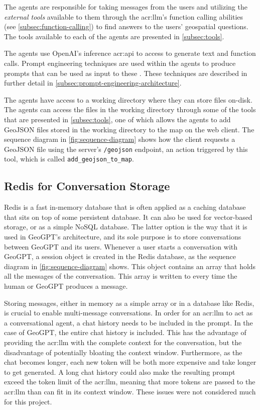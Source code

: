 The agents are responsible for taking messages from the users and utilizing the \textit{external tools} available to them through the \acrshort{acr:llm}'s function calling abilities (see \autoref{subsec:function-calling}) to find answers to the users' geospatial questions. The tools available to each of the agents are presented in \autoref{subsec:tools}.

The agents use OpenAI's inference \acrshort{acr:api} to access  to generate text and function calls. Prompt engineering techniques are used within the agents to produce prompts that can be used as input to these . These techniques are described in further detail in \autoref{subsec:prompt-engineering-architecture}.

The agents have access to a working directory where they can store files on-disk. The agents can access the files in the working directory through some of the tools that are presented in \autoref{subsec:tools}, one of which allows the agents to add GeoJSON files stored in the working directory to the map on the web client. The sequence diagram in \autoref{fig:sequence-diagram} shows how the client requests a GeoJSON file using the server's \texttt{/geojson} endpoint, an action triggered by this tool, which is called \texttt{add\_geojson\_to\_map}.


\subsection{Redis for Conversation Storage}
\label{subsec:redis-architecture}

Redis \citep{sanfilippoRedisRealtimeData2009} is a fast in-memory database that is often applied as a caching database that sits on top of some persistent database. It can also be used for vector-based storage, or as a simple NoSQL database. The latter option is the way that it is used in GeoGPT's architecture, and its sole purpose is to store conversations between GeoGPT and its users. Whenever a user starts a conversation with GeoGPT, a session object is created in the Redis database, as the sequence diagram in \autoref{fig:sequence-diagram} shows. This object contains an array that holds all the messages of the conversation. This array is written to every time the human or GeoGPT produces a message.

Storing messages, either in memory as a simple array or in a database like Redis, is crucial to enable multi-message conversations. In order for an \gls{acr:llm} to act as a conversational agent, a chat history needs to be included in the prompt. In the case of GeoGPT, the entire chat history is included. This has the advantage of providing the \gls{acr:llm} with the complete context for the conversation, but the disadvantage of potentially bloating the context window. Furthermore, as the chat becomes longer, each new token will be both more expensive and take longer to get generated. A long chat history could also make the resulting prompt exceed the token limit of the \gls{acr:llm}, meaning that more tokens are passed to the \acrshort{acr:llm} than can fit in its context window. These issues were not considered much for this project.

